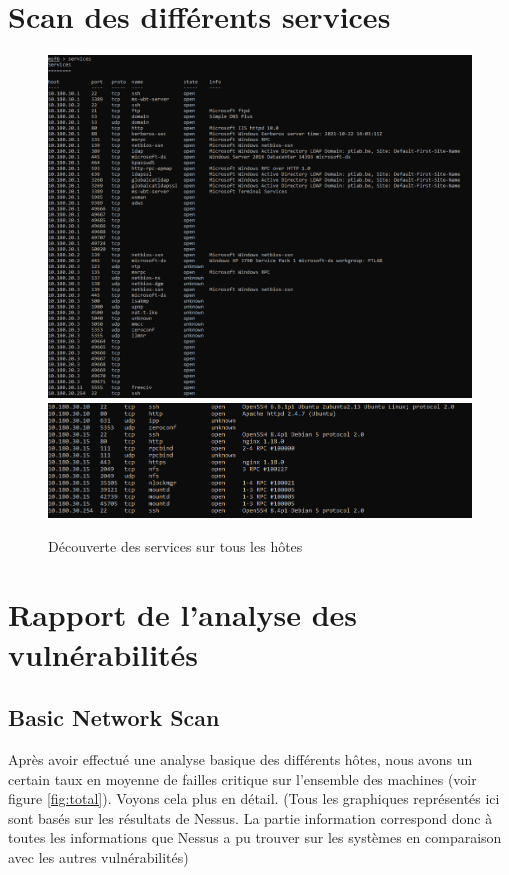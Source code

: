 \documentclass[a4paper]{article}
\begin{document}
\newpage \section{Scan des différents services}\label{app:services}
\begin{figure}[H]
    \centering
    \includegraphics[width=1\textwidth]{images/lab2/services.png}
    \includegraphics[width=1\textwidth]{images/lab2/hosts2.png}
    \caption{Découverte des services sur tous les hôtes}
    \label{fig:service}
\end{figure}

\newpage \section{Rapport de l'analyse des vulnérabilités}\label{app:rapportvuln}
\subsection{Basic Network Scan}
Après avoir effectué une analyse basique des différents hôtes, nous avons un certain taux en moyenne de failles critique sur l'ensemble des machines (voir figure \ref{fig:total}). Voyons cela plus en détail. (Tous les graphiques représentés ici sont basés sur les résultats de Nessus. La partie information correspond donc à toutes les informations que Nessus a pu trouver sur les systèmes en comparaison avec les autres vulnérabilités)
\end{document}
